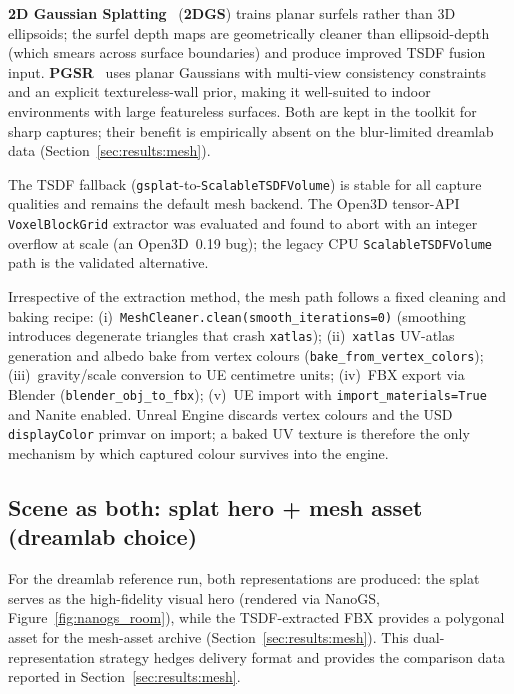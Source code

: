 \textbf{2D Gaussian Splatting}~\cite{huang2024_2dgs} (\textbf{2DGS}) trains
planar surfels rather than 3D ellipsoids; the surfel depth maps are geometrically cleaner
than ellipsoid-depth (which smears across surface boundaries) and produce improved TSDF
fusion input.  \textbf{PGSR}~\cite{chen2024_pgsr} uses planar Gaussians with multi-view
consistency constraints and an explicit textureless-wall prior, making it well-suited to
indoor environments with large featureless surfaces.  Both are kept in the toolkit for
sharp captures; their benefit is empirically absent on the blur-limited dreamlab data
(Section~\ref{sec:results:mesh}).

The TSDF fallback (\texttt{gsplat}-to-\texttt{ScalableTSDFVolume}) is stable for all
capture qualities and remains the default mesh backend.  The Open3D tensor-API
\texttt{VoxelBlockGrid} extractor was evaluated and found to abort with an integer
overflow at scale (an Open3D~0.19 bug); the legacy CPU \texttt{ScalableTSDFVolume} path
is the validated alternative.

Irrespective of the extraction method, the mesh path follows a fixed cleaning and baking
recipe: (i)~\texttt{MeshCleaner.clean(smooth\_iterations=0)} (smoothing introduces
degenerate triangles that crash \texttt{xatlas}); (ii)~\texttt{xatlas} UV-atlas
generation and albedo bake from vertex colours (\texttt{bake\_from\_vertex\_colors});
(iii)~gravity/scale conversion to UE centimetre units; (iv)~FBX export via Blender
(\texttt{blender\_obj\_to\_fbx}); (v)~UE import with \texttt{import\_materials=True}
and Nanite enabled.  Unreal Engine discards vertex colours and the USD
\texttt{displayColor} primvar on import; a baked UV texture is therefore the only
mechanism by which captured colour survives into the engine.

\subsection{Scene as both: splat hero + mesh asset (dreamlab choice)}
For the dreamlab reference run, both representations are produced: the splat serves as
the high-fidelity visual hero (rendered via NanoGS, Figure~\ref{fig:nanogs_room}), while
the TSDF-extracted FBX provides a polygonal asset for the mesh-asset archive
(Section~\ref{sec:results:mesh}).  This dual-representation strategy hedges delivery
format and provides the comparison data reported in Section~\ref{sec:results:mesh}.

